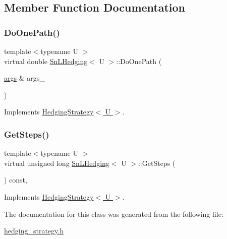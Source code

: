 \subsection{Member Function Documentation}
\hypertarget{classSnLHedging_a6d3f4f5b4e0a56935b9155222a95a76e}{}\label{classSnLHedging_a6d3f4f5b4e0a56935b9155222a95a76e} 
\subsubsection{\texorpdfstring{Do\+One\+Path()}{DoOnePath()}}
{\footnotesize\ttfamily template$<$typename U $>$ \\
virtual double \hyperlink{classSnLHedging}{Sn\+L\+Hedging}$<$ U $>$\+::Do\+One\+Path (\begin{DoxyParamCaption}\item[{\hyperlink{path__generation_8h_a75c13cde2074f502cc4348c70528572d}{args} \&}]{args\+\_\+ }\end{DoxyParamCaption})\hspace{0.3cm}{\ttfamily [virtual]}}



Implements \hyperlink{classHedgingStrategy_ad2a7c02ee59750c40f29a03ee6fee140}{Hedging\+Strategy$<$ U $>$}.

\hypertarget{classSnLHedging_ac44156b45dd20237fc5030877f9b6c66}{}\label{classSnLHedging_ac44156b45dd20237fc5030877f9b6c66} 
\subsubsection{\texorpdfstring{Get\+Steps()}{GetSteps()}}
{\footnotesize\ttfamily template$<$typename U $>$ \\
virtual unsigned long \hyperlink{classSnLHedging}{Sn\+L\+Hedging}$<$ U $>$\+::Get\+Steps (\begin{DoxyParamCaption}{ }\end{DoxyParamCaption}) const\hspace{0.3cm}{\ttfamily [inline]}, {\ttfamily [virtual]}}



Implements \hyperlink{classHedgingStrategy_a4df1155158f019fb0c4f565045b9e633}{Hedging\+Strategy$<$ U $>$}.



The documentation for this class was generated from the following file\+:\begin{DoxyCompactItemize}
\item 
\hyperlink{hedging__strategy_8h}{hedging\+\_\+strategy.\+h}\end{DoxyCompactItemize}
